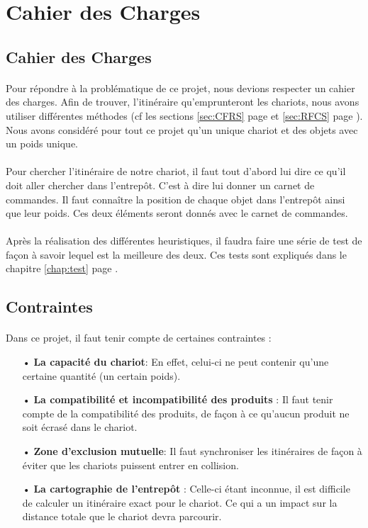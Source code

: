 \documentclass[twoside,UTF8]{EPURapport}
\begin{document}
\section{Cahier des Charges}
\subsection{Cahier des Charges}
\paragraph{}Pour répondre à la problématique de ce projet, nous devions respecter un cahier des charges. Afin de trouver, l'itinéraire qu'emprunteront les chariots, nous avons utiliser différentes méthodes (cf les sections \ref{sec:CFRS} page \pageref{sec:CFRS} et \ref{sec:RFCS} page \pageref{sec:RFCS}). Nous avons considéré pour tout ce projet qu'un unique chariot et des objets avec un poids unique. 

\paragraph{}Pour chercher l'itinéraire de notre chariot, il faut tout d'abord lui dire ce qu'il doit aller chercher dans l'entrepôt. C'est à dire lui donner un carnet de commandes. Il faut connaître la position de chaque objet dans l'entrepôt ainsi que leur poids. Ces deux éléments seront donnés avec le carnet de commandes.

\paragraph{}Après la réalisation des différentes heuristiques, il faudra faire une série de test de façon à savoir lequel est la meilleure des deux. Ces tests sont expliqués dans le chapitre \ref{chap:test} page \pageref{chap:test}.

\subsection{Contraintes}
\label{sec:Contraintes}
\paragraph{}Dans ce projet, il faut tenir compte de certaines contraintes : 
\begin{itemize}
\item[•]\textbf{La capacité du chariot}: En effet, celui-ci ne peut contenir qu'une certaine quantité (un certain poids).
\item[•]\textbf{La compatibilité et incompatibilité des produits} : Il faut tenir compte de la compatibilité des produits, de façon à ce qu'aucun produit ne soit écrasé dans le chariot.
\item[•]\textbf{Zone d'exclusion mutuelle}: Il faut synchroniser les itinéraires de façon à éviter que les chariots puissent entrer en collision. 
\item[•]\textbf{La cartographie de l'entrepôt} : Celle-ci étant inconnue, il est difficile de calculer un itinéraire exact pour le chariot. Ce qui a un impact sur la distance totale que le chariot devra parcourir.
\end{itemize} 
\end{document}
